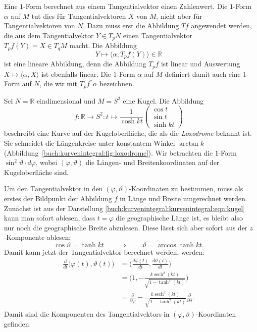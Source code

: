 Eine $1$-Form berechnet aus einem Tangentialvektor einen Zahlenwert.
Die $1$-Form $\alpha$ auf $M$ tut dies für Tangentialvektoren $X$ von
$M$, nicht aber für Tangentialvektoren von $N$.
Dazu muss erst die Abbildung $Tf$ angewendet werden, die aus dem
Tangentialvektor $Y\in T_pN$ einen Tangentialvektor $T_pf(Y)=X\in T_qM$
macht.
Die Abbildung
\[
Y\mapsto \langle \alpha, T_pf(Y)\rangle \in \mathbb{R}
\]
ist eine lineare Abbildung, denn die Abbildung $T_pf$ ist linear und
Auswertung $X\mapsto \langle\alpha,X\rangle$ ist ebenfalls linear.
Die $1$-Form $\alpha$ auf $M$ definiert damit auch eine $1$-Form auf
$N$, die wir mit $T_pf^*\alpha$ bezeichnen.

\begin{beispiel}
\label{buch:kurvenintegral:kurvenintegral:beispiel:loxodrome}
%
Sei $N=\mathbb{R}$ eindimensional und $M=S^2$ eine Kugel.
Die Abbildung 
\begin{equation}
f
\colon
\mathbb{R}\to S^2
:
t
\mapsto 
\frac{1}{\cosh kt}
\begin{pmatrix}
\cos t\\
\sin t\\
\sinh kt
\end{pmatrix}
\label{buch:kurvenintegral:kurvenintegral:eqn:kugel}
\end{equation}
beschreibt eine Kurve auf der Kugeloberfläche, die als die
{\em Loxodrome} bekannt ist.
Sie schneidet die Längenkreise unter konstantem Winkel $\arctan k$
(Abbildung~\ref{buch:kurvenintegral:fig:loxodrome}).
Wir betrachten die $1$-Form $\sin^2\vartheta\cdot d\varphi$, wobei
$(\varphi,\vartheta)$ die Längen- und Breitenkoordinaten auf der
Kugeloberfläche sind.

Um den Tangentialvektor in den $(\varphi,\vartheta)$-Koordinaten zu
bestimmen, muss als erstes der Bildpunkt der Abbildung $f$ in Länge
und Breite umgerechnet werden.
Zunächst ist aus der Darstellung
\eqref{buch:kurvenintegral:kurvenintegral:eqn:kugel}
kann man sofort ablesen, dass $t=\varphi$ die geographische Länge ist,
es bleibt also nur noch die geographische Breite abzulesen.
Diese lässt sich aber sofort aus der $z$-Komponente ablesen:
\[
\cos\vartheta
=
\tanh kt
\qquad\Rightarrow\qquad
\vartheta = \arccos\tanh kt.
\]
Damit kann jetzt der Tangentialvektor berechnet werden, werden:
\begin{align*}
\frac{d}{dt} \bigl(\varphi(t),\vartheta(t)\bigr)
&=
\biggl(
\frac{d\varphi(t)}{dt},
\frac{d\vartheta(t)}{dt}
\biggr)
\\
&=
\biggl(1,
-\frac{k\operatorname{sech}^2(kt)}{\sqrt{1-\tanh^2(kt)}}
\biggr)
\\
&=
\frac{\partial}{\partial \varphi}
-
\frac{k\operatorname{sech}^2(kt)}{\sqrt{1-\tanh^2(kt)}}
\frac{\partial}{\partial\vartheta}
.
\end{align*}
Damit sind die Komponenten des Tangentialvektors in
$(\varphi,\vartheta)$-Koordinaten gefinden.


\end{beispiel}
